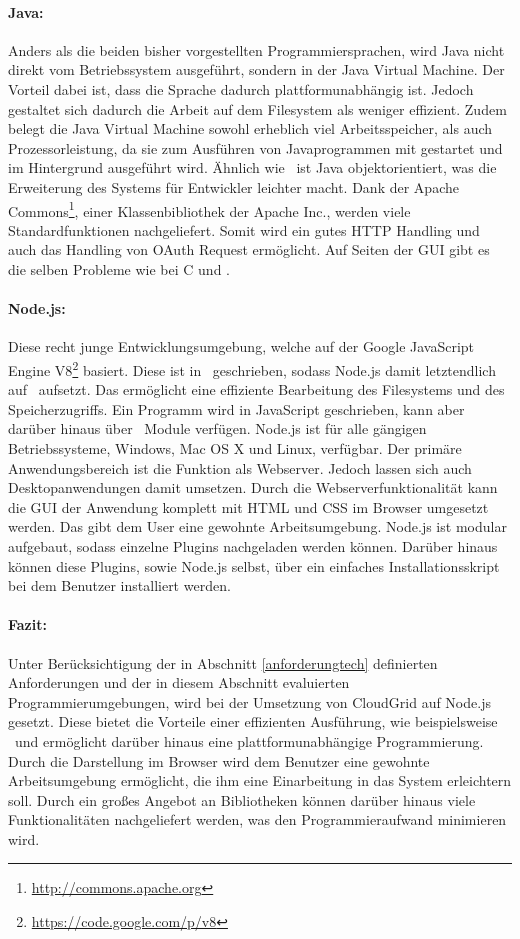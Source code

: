 \paragraph{Java:}
Anders als die beiden bisher vorgestellten Programmiersprachen, wird Java nicht direkt vom Betriebssystem ausgeführt, sondern in der Java Virtual Machine.
Der Vorteil dabei ist, dass die Sprache dadurch plattformunabhängig ist.
Jedoch gestaltet sich dadurch die Arbeit auf dem Filesystem als weniger effizient.
Zudem belegt die Java Virtual Machine sowohl erheblich viel Arbeitsspeicher, als auch Prozessorleistung, da sie zum Ausführen von Javaprogrammen mit gestartet und im Hintergrund ausgeführt wird.
Ähnlich wie \cpp\ ist Java objektorientiert, was die Erweiterung des Systems für Entwickler leichter macht.
Dank der Apache Commons\footnote{\url{http://commons.apache.org}}, einer Klassenbibliothek der Apache Inc., werden viele Standardfunktionen nachgeliefert.
Somit wird ein gutes \ac{HTTP} Handling und auch das Handling von OAuth Request ermöglicht.
Auf Seiten der \ac{GUI} gibt es die selben Probleme wie bei C und \cpp .

\paragraph{Node.js:}
Diese recht junge Entwicklungsumgebung, welche auf der Google JavaScript Engine V8\footnote{\url{https://code.google.com/p/v8}} basiert.
Diese ist in \cpp\ geschrieben, sodass Node.js damit letztendlich auf \cpp\ aufsetzt.
Das ermöglicht eine effiziente Bearbeitung des Filesystems und des Speicherzugriffs.
Ein Programm wird in JavaScript geschrieben, kann aber darüber hinaus über \cpp\ Module verfügen.
Node.js ist für alle gängigen Betriebssysteme, Windows, Mac OS X und Linux, verfügbar.
Der primäre Anwendungsbereich ist die Funktion als Webserver.
Jedoch lassen sich auch Desktopanwendungen damit umsetzen.
Durch die Webserverfunktionalität kann die \ac{GUI} der Anwendung komplett mit \ac{HTML} und \ac{CSS} im Browser umgesetzt werden.
Das gibt dem User eine gewohnte Arbeitsumgebung.
Node.js ist modular aufgebaut, sodass einzelne Plugins nachgeladen werden können.
Darüber hinaus können diese Plugins, sowie Node.js selbst, über ein einfaches Installationsskript bei dem Benutzer installiert werden.

\paragraph{Fazit:}
Unter Berücksichtigung der in Abschnitt \ref{anforderungtech} definierten Anforderungen und der in diesem Abschnitt evaluierten Programmierumgebungen, wird bei der Umsetzung von CloudGrid auf Node.js gesetzt.
Diese bietet die Vorteile einer effizienten Ausführung, wie beispielsweise \cpp\ und ermöglicht darüber hinaus eine plattformunabhängige Programmierung.
Durch die Darstellung im Browser wird dem Benutzer eine gewohnte Arbeitsumgebung ermöglicht, die ihm eine Einarbeitung in das System erleichtern soll.
Durch ein großes Angebot an Bibliotheken können darüber hinaus viele Funktionalitäten nachgeliefert werden, was den Programmieraufwand minimieren wird.

